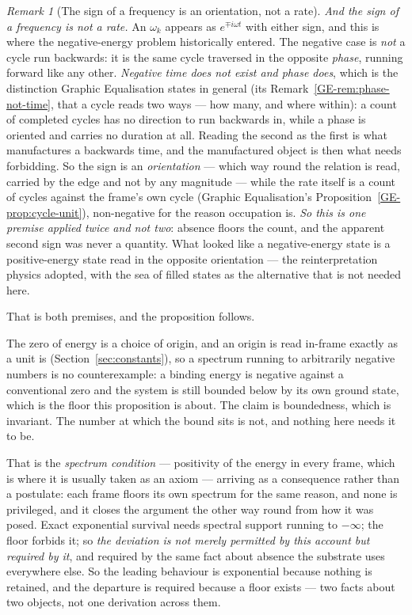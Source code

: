 \documentclass[11pt,a4paper]{article}
\theoremstyle{remark}\newtheorem{remark}[definition]{Remark}
\begin{document}
\begin{remark}[The sign of a frequency is an orientation, not a rate]\label{rem:sign-is-phase}
\emph{And the sign of a frequency is not a rate.} An $\omega_k$ appears as $e^{\mp i\omega t}$ with
either sign, and this is where the negative-energy problem historically entered. The negative case is
\emph{not} a cycle run backwards: it is the same cycle traversed in the opposite \emph{phase},
running forward like any other. \emph{Negative time does not exist and phase does}, which is the
distinction Graphic Equalisation states in general (its Remark~\ref{GE-rem:phase-not-time}, that a
cycle reads two ways --- how many, and where within): a count of completed cycles has no direction to run backwards in, while a phase is
oriented and carries no duration at all. Reading the second as the first is what manufactures a
backwards time, and the manufactured object is then what needs forbidding. So the sign is an \emph{orientation} --- which way round the relation
is read, carried by the edge and not by any magnitude --- while the rate itself is a count of cycles
against the frame's own cycle (Graphic Equalisation's Proposition~\ref{GE-prop:cycle-unit}),
non-negative for the reason
occupation is. \emph{So this is one premise applied twice and not two}: absence floors the count, and
the apparent second sign was never a quantity. What looked like a negative-energy state is a
positive-energy state read in the opposite orientation --- the reinterpretation physics adopted, with
the sea of filled states as the alternative that is not needed here.
\end{remark}

That is both premises, and the proposition follows.

The zero of energy is a choice of origin,
and an origin is read in-frame exactly as a unit is (Section~\ref{sec:constants}), so a spectrum running to
arbitrarily negative numbers is no counterexample: a binding energy is negative against a
conventional zero and the system is still bounded below by its own ground state, which is the floor
this proposition is about. The claim is boundedness, which is invariant. The number at which the
bound sits is not, and nothing here needs it to be.

That is the \emph{spectrum condition} --- positivity of the energy in every frame, which is where it
is usually taken as an axiom \citep{streater1964} --- arriving as a consequence rather than a
postulate: each frame floors its own spectrum for the same reason, and none is privileged, and it
closes the
argument the other way round from how it was posed. Exact exponential survival needs spectral support
running to $-\infty$; the floor forbids it; so \emph{the deviation is not merely permitted by this
account but required by it}, and required by the same fact about absence the substrate uses
everywhere else. So the leading behaviour is exponential because nothing is retained, and the
departure is required because a floor exists --- two facts about two objects, not one derivation
across them.
\end{document}

